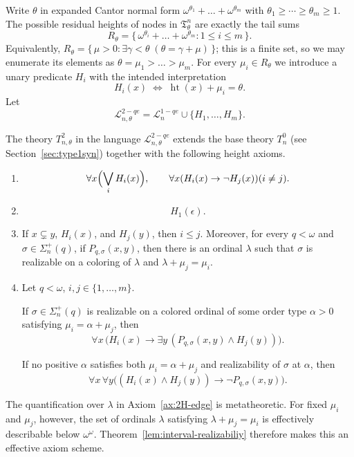 \documentclass{amsart}
\theoremstyle{definition}
\begin{document}
Write $\theta$ in expanded Cantor normal form $\omega^{\theta_1}+\dots+\omega^{\theta_m}$ with $\theta_1\ge\cdots\ge\theta_m\ge 1$.  The possible residual heights of nodes in $\mathfrak{T}_\theta^n$ are exactly the tail sums
$$R_\theta=\bigl\{\,\omega^{\theta_i}+\dots+\omega^{\theta_m}:1\le i\le m\,\bigr\}.$$
Equivalently, $R_\theta=\{\,\mu>0:\exists\gamma<\theta\;(\theta=\gamma+\mu)\,\}$; this is a finite set, so we may enumerate its elements as $\theta=\mu_1>\dots>\mu_{m}$. For every $\mu_i\in R_\theta$ we introduce a unary predicate $H_i$ with the intended interpretation
$$H_i(x)\;\Longleftrightarrow\; \operatorname{ht}(x)+\mu_i=\theta.$$
Let
$$\mathcal{L}_{n,\theta}^{2-qe}= \mathcal{L}_n^{1-qe}\cup\{H_1,\dots,H_{m}\}.$$

The theory $T_{n,\theta}^2$ in the language $\mathcal{L}_{n,\theta}^{2-qe}$ extends the base theory $T_n^0$ (see Section~\ref{sec:type1syn}) together with the following height axioms.

\begin{enumerate}[label=\textnormal{(B\arabic*)}]
    \item\label{ax:2H-partition}
        $$\forall x\Bigl(\bigvee_{i}H_i(x)\Bigr),\qquad \forall x(H_i(x)\to\neg H_j(x))(i\neq j).$$
    \item\label{ax:2H-root}
        $$H_1(\epsilon).$$
    \item\label{ax:2H-edge}
        If $x\subsetneq y$, $H_i(x)$, and $H_j(y)$, then $i\leq j$. Moreover, for every $q<\omega$ and $\sigma\in\Sigma_n^+(q)$, if $P_{q,\sigma}(x,y)$, then there is an ordinal $\lambda$ such that $\sigma$ is realizable on a coloring of $\lambda$ and $\lambda+\mu_j=\mu_i$.
    \item\label{ax:2H-realizability}
        Let $q<\omega$, $i,j\in\{1,\dots,m\}$.

If $\sigma\in\Sigma_n^+(q)$ is realizable on a colored ordinal of some order type $\alpha>0$ satisfying $\mu_i=\alpha+\mu_j$, then
        $$\forall x\,\bigl(H_i(x)\to\exists y\,(P_{q,\sigma}(x,y)\land H_j(y))\bigr).$$

If no positive $\alpha$ satisfies both $\mu_i=\alpha+\mu_j$ and realizability of $\sigma$ at $\alpha$, then
$$\forall x\,\forall y\bigl((H_i(x)\land H_j(y))\to\neg P_{q,\sigma}(x,y)\bigr).$$
\end{enumerate}
The quantification over $\lambda$ in Axiom~\ref{ax:2H-edge} is metatheoretic. For fixed $\mu_i$ and $\mu_j$, however, the set of ordinals $\lambda$ satisfying $\lambda+\mu_j=\mu_i$ is effectively describable below $\omega^\omega$. Theorem~\ref{lem:interval-realizabiliy} therefore makes this an effective axiom scheme.
\end{document}

